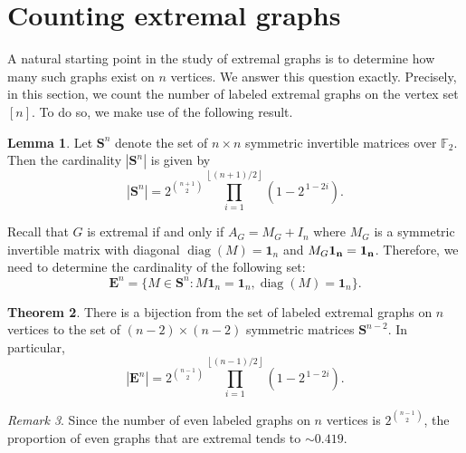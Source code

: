 \documentclass{amsart}
\theoremstyle{definition}
\newtheorem{theorem}{Theorem}[section]
\newtheorem{lemma}[theorem]{Lemma}
\theoremstyle{remark}
\newtheorem{remark}[theorem]{Remark}
\def\FF{\mathbb{F}}
\def\S{\boldsymbol{S}}
\def\E{\boldsymbol{E}}
\DeclareMathOperator{\diag}{diag}
\begin{document}
\section{Counting extremal graphs}\label{sec-count}

A natural starting point in the study of extremal graphs is to determine how many such graphs exist on $n$ vertices. We answer this question exactly.
Precisely, in this section, we count the number of labeled extremal graphs on the vertex set $[n]$. To do so, we make use of the following result.

\begin{lemma}\cite{macwilliams1969orthogonal}
    Let $\S^n$ denote the set of $n\times n$ symmetric invertible matrices over $\FF_2$. Then the cardinality $|\S^n|$ is given by
    \[
        |\S^n| = 2^{\binom{n+1}{2}} \prod_{i=1}^{\left\lfloor (n+1)/2 \right\rfloor}\left( 1 - 2^{\,1-2i} \right).
    \]
\end{lemma}

Recall that $G$ is extremal if and only if $A_G = M_G + I_n$ where $M_G$ is a symmetric invertible matrix with diagonal $\diag(M)=\mathbf{1}_n$ and $M_G\bf{1}_n = \bf{1}_n$. Therefore, we need to determine the cardinality of the following set:
\[\E^n = \{M \in \S^n\colon M\mathbf{1}_n = \mathbf{1}_n, \diag (M) = \mathbf{1}_n\}.\]

\begin{theorem}\label{thm:count}
    There is a bijection from the set of labeled extremal graphs on $n$ vertices to the set of $(n-2)\times(n-2)$ symmetric matrices $\S^{n-2}$. In particular,
    \[
        |\E^n|  = 2^{\binom{n-1}{2}} \prod_{i=1}^{\left\lfloor (n-1)/2 \right\rfloor}\left( 1 - 2^{\,1-2i} \right).
    \]
\end{theorem}

\begin{remark}
    Since the number of even labeled graphs on $n$ vertices is $2^{\binom{n-1}{2}}$, the proportion of even graphs that are extremal tends to $\sim 0.419$.
\end{remark}
\end{document}
